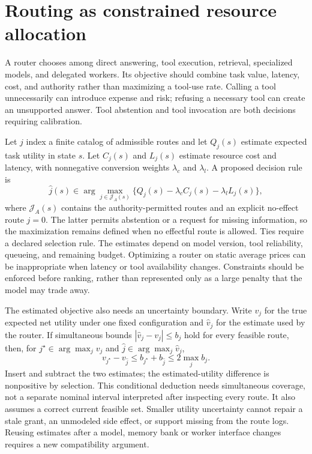 \section{Routing as constrained resource allocation}\label{sec:C18:routing}
A router chooses among direct answering, tool execution, retrieval, specialized models, and delegated workers. Its objective should combine task value, latency, cost, and authority rather than maximizing a tool-use rate. Calling a tool unnecessarily can introduce expense and risk; refusing a necessary tool can create an unsupported answer. Tool abstention and tool invocation are both decisions requiring calibration.

Let $j$ index a finite catalog of admissible routes and let $Q_j(s)$ estimate expected task utility in state $s$. Let $C_j(s)$ and $L_j(s)$ estimate resource cost and latency, with nonnegative conversion weights $\lambda_c$ and $\lambda_l$. A proposed decision rule is
\begin{equation}
 \widehat j(s)\in\arg\max_{j\in\mathcal J_A(s)}
 \{Q_j(s)-\lambda_c C_j(s)-\lambda_l L_j(s)\},
\end{equation}
where $\mathcal J_A(s)$ contains the authority-permitted routes and an explicit no-effect route $j=0$. The latter permits abstention or a request for missing information, so the maximization remains defined when no effectful route is allowed. Ties require a declared selection rule. The estimates depend on model version, tool reliability, queueing, and remaining budget. Optimizing a router on static average prices can be inappropriate when latency or tool availability changes. Constraints should be enforced before ranking, rather than represented only as a large penalty that the model may trade away.

The estimated objective also needs an uncertainty boundary. Write $v_j$ for the true expected net utility under one fixed configuration and $\widehat v_j$ for the estimate used by the router. If simultaneous bounds $|\widehat v_j-v_j|\leq b_j$ hold for every feasible route, then, for $j^\star\in\arg\max_jv_j$ and $\widehat j\in\arg\max_j\widehat v_j$,
\begin{equation}
 v_{j^\star}-v_{\widehat j}
 \leq b_{j^\star}+b_{\widehat j}
 \leq2\max_j b_j.
\end{equation}
Insert and subtract the two estimates; the estimated-utility difference is nonpositive by selection. This conditional deduction needs simultaneous coverage, not a separate nominal interval interpreted after inspecting every route. It also assumes a correct current feasible set. Smaller utility uncertainty cannot repair a stale grant, an unmodeled side effect, or support missing from the route logs. Reusing estimates after a model, memory bank or worker interface changes requires a new compatibility argument.


